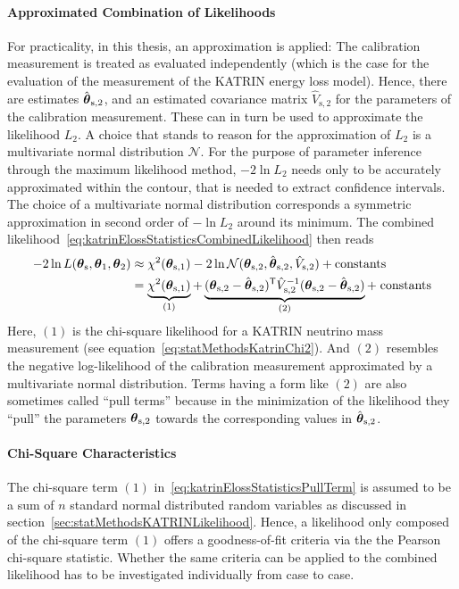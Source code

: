 \paragraph{Approximated Combination of Likelihoods}
For practicality, in this thesis, an approximation is applied: The calibration measurement is treated as evaluated independently (which is the case for the evaluation of the measurement of the KATRIN energy loss model). Hence, there are estimates $\hat{\boldsymbol{\mathbf{\theta}}}_\mathrm{s,2}$, and an estimated covariance matrix $\hat{V}_\mathrm{s,2}$ for the parameters of the calibration measurement. These can in turn be used to approximate the likelihood $L_2$. A choice that stands to reason for the approximation of $L_2$ is a multivariate normal distribution $\mathcal{N}$. For the purpose of parameter inference through the maximum likelihood method, $-2\ln L_2$ needs only to be accurately approximated within the contour, that is needed to extract confidence intervals. The choice of a multivariate normal distribution corresponds a symmetric approximation in second order of $-\ln L_2$ around its minimum. The combined likelihood~\eqref{eq:katrinElossStatisticsCombinedLikelihood} then reads
\begin{equation}
\begin{split}
\label{eq:katrinElossStatisticsPullTerm}
-2\ln L(\paramVecShared, \paramVec_1, \paramVec_2) &\approx
\chi^2(\paramVecSOne) 
-2\ln \mathcal{N}(\paramVecSTwo, \hat{\paramVec}_\mathrm{s,2}, \hat{V}_\mathrm{s,2}) +
\mathrm{ constants}\\ &=
\underbrace{
	\chi^2(\paramVecSOne)
	\vphantom{(\paramVecSTwo - \hat{\paramVec}_\mathrm{s,2})^{\mathsf{T}}}
}_{(1)}
+
\underbrace{
	(\paramVec_\mathrm{s,2} - \hat{\paramVec}_\mathrm{s,2})^{\mathsf{T}}
	\hat{V}_\mathrm{s,2}^{-1}
	(\paramVec_\mathrm{s,2} - \hat{\paramVec}_\mathrm{s,2})
}_{(2)} +\; 
\mathrm{ constants}
\end{split}
\end{equation}
Here, $(1)$ is the chi-square likelihood for a KATRIN neutrino mass measurement (see equation~\ref{eq:statMethodsKatrinChi2}). And $(2)$ resembles the negative log-likelihood of the calibration measurement approximated by a multivariate normal distribution. Terms having a form like $(2)$ are also sometimes called ``pull terms'' because in the minimization of the likelihood they ``pull'' the parameters $\boldsymbol{\mathbf{\theta}}_\mathrm{s,2}$ towards the corresponding values in $\hat{\boldsymbol{\mathbf{\theta}}}_\mathrm{s,2}$.

\paragraph{Chi-Square Characteristics}
The chi-square term $(1)$ in~\eqref{eq:katrinElossStatisticsPullTerm} is assumed to be a sum of $n$ standard normal distributed random variables as discussed in section~\ref{sec:statMethodsKATRINLikelihood}. Hence, a likelihood only composed of the chi-square term $(1)$ offers a goodness-of-fit criteria via the the Pearson chi-square statistic. Whether the same criteria can be applied to the combined likelihood has to be investigated individually from case to case.


